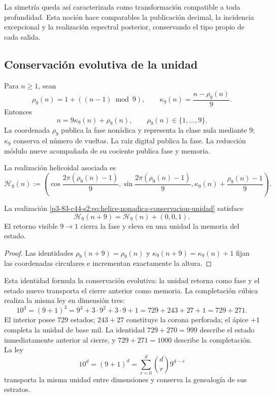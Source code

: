 La simetría queda así caracterizada como transformación compatible a toda
profundidad. Esta noción hace comparables la publicación decimal, la
incidencia excepcional y la realización espectral posterior, conservando el
tipo propio de cada salida.

\subsection{Conservación evolutiva de la unidad}

Para \(n\geq1\), sean
\begin{equation}
 \rho_9(n)=1+((n-1)\bmod 9),
 \qquad
 \kappa_9(n)=\frac{n-\rho_9(n)}9.
 \label{p3-83-c44-s2:eq:residuo-cociente-conservacion-unidad}
\end{equation}
Entonces
\[
 n=9\kappa_9(n)+\rho_9(n),
 \qquad
 \rho_9(n)\in\{1,\ldots,9\}.
\]
La coordenada \(\rho_9\) publica la fase nonádica y representa la clase nula
mediante \(9\); \(\kappa_9\) conserva el número de vueltas. La raíz digital
publica la fase. La reducción módulo nueve acompañada de su cociente publica
fase y memoria.

La realización helicoidal asociada es
\begin{equation}
 \mathcal H_9(n):=
 \left(
 \cos\frac{2\pi(\rho_9(n)-1)}9,
 \sin\frac{2\pi(\rho_9(n)-1)}9,
 \kappa_9(n)+\frac{\rho_9(n)-1}{9}
 \right).
 \label{p3-83-c44-s2:eq:helice-nonadica-conservacion-unidad}
\end{equation}

\begin{proposition}
\label{p3-83-c44-s2:prop:retorno-fase-avance-memoria}
La realización \eqref{p3-83-c44-s2:eq:helice-nonadica-conservacion-unidad} satisface
\[
 \mathcal H_9(n+9)=\mathcal H_9(n)+(0,0,1).
\]
El retorno visible \(9\to1\) cierra la fase y eleva en una unidad la memoria
del estado.
\end{proposition}

\begin{proof}
Las identidades
\(\rho_9(n+9)=\rho_9(n)\) y
\(\kappa_9(n+9)=\kappa_9(n)+1\) fijan las coordenadas circulares e
incrementan exactamente la altura.
\end{proof}

Esta identidad formula la conservación evolutiva: la unidad retorna como
fase y el estado nuevo transporta el cierre anterior como memoria. La
completación cúbica realiza la misma ley en dimensión tres:
\begin{equation}
 10^3=(9+1)^3
 =9^3+3\cdot9^2+3\cdot9+1
 =729+243+27+1
 =729+271.
 \label{p3-83-c44-s2:eq:emrh-conservacion-evolutiva-unidad}
\end{equation}
El interior posee \(729\) estados; \(243+27\) constituye la corona
perforada; el ápice \(+1\) completa la unidad de base mil. La identidad
\(729+270=999\) describe el estado inmediatamente anterior al cierre, y
\(729+271=1000\) describe la completación. La ley
\[
 10^d=(9+1)^d
 =\sum_{r=0}^{d}\binom dr9^{d-r}
\]
transporta la misma unidad entre dimensiones y conserva la genealogía de sus
estratos.

